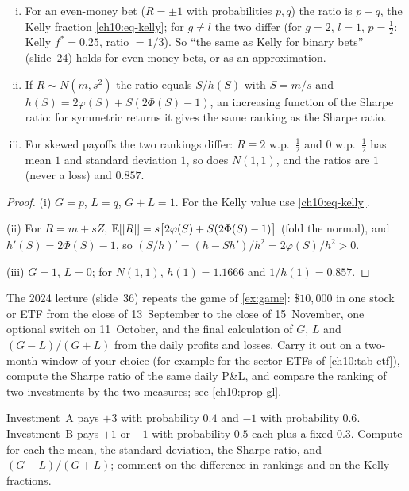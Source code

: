 \begin{paracol}{2}
\begin{proposition}\label{ch10:prop-gl}
\leavevmode
\begin{enumerate}[(i)]
  \item For an even-money bet ($R=\pm1$ with probabilities $p,q$) the ratio is $p-q$, the Kelly fraction \eqref{ch10:eq-kelly};
      for $g\neq l$ the two differ (for $g=2$, $l=1$, $p=\frac12$: Kelly $f^*=0.25$, ratio $=1/3$). So ``the same as Kelly
      for binary bets'' (slide~24) holds for even-money bets, or as an approximation.
  \item If $R\sim N(m,s^2)$ the ratio equals $S/h(S)$ with $S=m/s$ and $h(S)=2\varphi(S)+S(2\Phi(S)-1)$, an increasing function
      of the Sharpe ratio: for symmetric returns it gives the same ranking as the Sharpe ratio.
  \item For skewed payoffs the two rankings differ: $R\equiv2$ w.p.\ $\frac12$ and $0$ w.p.\ $\frac12$ has mean $1$ and standard deviation $1$,
      so does $N(1,1)$, and the ratios are $1$ (never a loss) and $0.857$.
\end{enumerate}
\end{proposition}
\begin{proof}
(i) $G=p$, $L=q$, $G+L=1$. For the Kelly value use \eqref{ch10:eq-kelly}.

(ii) For $R=m+sZ$,
$\mathbb{E}[|R|]=s\bigl[2\varphi(S)+S(2\Phi(S)-1)\bigr]$ (fold the normal), and $h'(S)=2\Phi(S)-1$, so
$(S/h)'=(h-Sh')/h^2=2\varphi(S)/h^2>0$.

(iii) $G=1$, $L=0$; for $N(1,1)$, $h(1)=1.1666$ and $1/h(1)=0.857$.
\end{proof}

\begin{exercise}\label{ch10:ex-game}
The 2024 lecture (slide~36) repeats the game of \cref{ex:game}: $\$10{,}000$ in one stock or ETF from the close of 13~September to the
close of 15~November, one optional switch on 11~October, and the final calculation of $G$, $L$ and $(G-L)/(G+L)$ from the daily
profits and losses. Carry it out on a two-month window of your choice (for example for the sector ETFs of \cref{ch10:tab-etf}), compute the
Sharpe ratio of the same daily P\&L, and compare the ranking of two investments by the two measures; see \cref{ch10:prop-gl}.
\end{exercise}

\begin{exercise}
Investment~A pays $+3$ with probability $0.4$ and $-1$ with probability $0.6$. Investment~B pays $+1$ or $-1$
with probability $0.5$ each plus a fixed $0.3$. Compute for each the mean, the standard deviation, the Sharpe ratio, and
$(G-L)/(G+L)$; comment on the difference in rankings and on the Kelly fractions.
\end{exercise}


\end{paracol}
